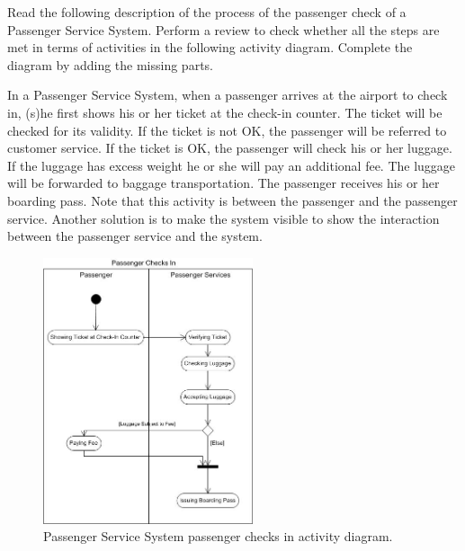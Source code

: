 \begin{exercise}
    Read the following description of the process of the passenger check of a Passenger Service System. Perform a review to check whether all the steps are met in terms of activities in the following activity diagram. Complete the diagram by adding the missing parts.
    
    \begin{displayquote}
        In a Passenger Service System, when a passenger arrives at the airport to check in, (s)he first shows his or her ticket at the check-in counter. The ticket will be checked for its validity. If the ticket is not OK, the passenger will be referred to customer service. If the ticket is OK, the passenger will check his or her luggage. If the luggage has excess weight he or she will pay an additional fee. The luggage will be forwarded to baggage transportation. The passenger receives his or her boarding pass. Note that this activity is between the passenger and the passenger service. Another solution is to make the system visible to show the interaction between the passenger service and the system.
    \end{displayquote}
    
    \begin{figure}[H]
        \centering
        \includegraphics[width=0.55\textwidth]{images/passenger-activity.jpg}
        \caption{Passenger Service System passenger checks in activity diagram.}
        \label{fig:pass-checks-in}
    \end{figure}
\end{exercise}
